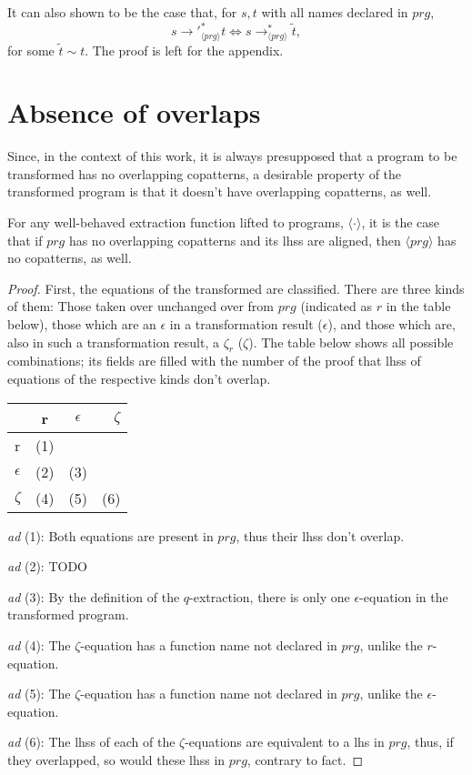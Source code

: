 It can also shown to be the case that, for $s,t$ with all names declared in $prg$,
\begin{equation}
s {\longrightarrow'}_{\langle prg \rangle}^* t \iff s \longrightarrow^*_{\langle prg \rangle} \widetilde{t},
\end{equation}
for some $\widetilde{t} \sim t$. The proof is left for the appendix.

\section{Absence of overlaps}

Since, in the context of this work, it is always presupposed that a program to be transformed has no overlapping copatterns, a desirable property of the transformed program is that it doesn't have overlapping copatterns, as well.

\begin{proposition}
For any well-behaved extraction function lifted to programs, $\langle \cdot \rangle$, it is the case that if $prg$ has no overlapping copatterns and its lhss are aligned, then $\langle prg \rangle$ has no copatterns, as well.

\begin{proof}
First, the equations of the transformed are classified. There are three kinds of them: Those taken over unchanged over from $prg$ (indicated as $r$ in the table below), those which are an $\epsilon$ in a transformation result ($\epsilon$), and those which are, also in such a transformation result, a $\zeta_r$ ($\zeta$). The table below shows all possible combinations; its fields are filled with the number of the proof that lhss of equations of the respective kinds don't overlap.

\begin{tabular}{ l | c | c | r }  & r & $\epsilon$ & $\zeta$ \\ \hline r & (1) &  &  \\ \hline $\epsilon$ & (2) & (3) &  \\ \hline $\zeta$ & (4) & (5) & (6) \\ \hline \end{tabular}

\textit{ad} (1): Both equations are present in $prg$, thus their lhss don't overlap.

\textit{ad} (2): TODO

\textit{ad} (3): By the definition of the $q$-extraction, there is only one $\epsilon$-equation in the transformed program.

\textit{ad} (4): The $\zeta$-equation has a function name not declared in $prg$, unlike the $r$-equation.

\textit{ad} (5): The $\zeta$-equation has a function name not declared in $prg$, unlike the $\epsilon$-equation.

\textit{ad} (6): The lhss of each of the $\zeta$-equations are equivalent to a lhs in $prg$, thus, if they overlapped, so would these lhss in $prg$, contrary to fact.
\end{proof}
\end{proposition}